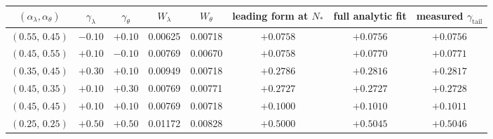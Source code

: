 \documentclass[11pt,reqno]{amsart}
\theoremstyle{plain}
\theoremstyle{definition}
\theoremstyle{remark}
\numberwithin{equation}{section}
\newcommand{\gtail}{\gamma_{\mathrm{tail}}}
\begin{document}
\begin{center}\footnotesize
\begin{tabular}{@{}cccccccc@{}}
\toprule
$(\alpha_\lambda,\alpha_\theta)$ & $\gamma_\lambda$ & $\gamma_\theta$ & $W_\lambda$ & $W_\theta$ & leading form at $N_*$ & full analytic fit & measured $\gtail$ \\
\midrule
$(0.55,\,0.45)$ & $-0.10$ & $+0.10$ & 0.00625 & 0.00718 & $+0.0758$ & $+0.0756$ & $+0.0756$ \\
$(0.45,\,0.55)$ & $+0.10$ & $-0.10$ & 0.00769 & 0.00670 & $+0.0758$ & $+0.0770$ & $+0.0771$ \\
$(0.35,\,0.45)$ & $+0.30$ & $+0.10$ & 0.00949 & 0.00718 & $+0.2786$ & $+0.2816$ & $+0.2817$ \\
$(0.45,\,0.35)$ & $+0.10$ & $+0.30$ & 0.00769 & 0.00771 & $+0.2727$ & $+0.2727$ & $+0.2728$ \\
$(0.45,\,0.45)$ & $+0.10$ & $+0.10$ & 0.00769 & 0.00718 & $+0.1000$ & $+0.1010$ & $+0.1011$ \\
$(0.25,\,0.25)$ & $+0.50$ & $+0.50$ & 0.01172 & 0.00828 & $+0.5000$ & $+0.5045$ & $+0.5046$ \\
\bottomrule
\end{tabular}
\end{center}
\end{document}
